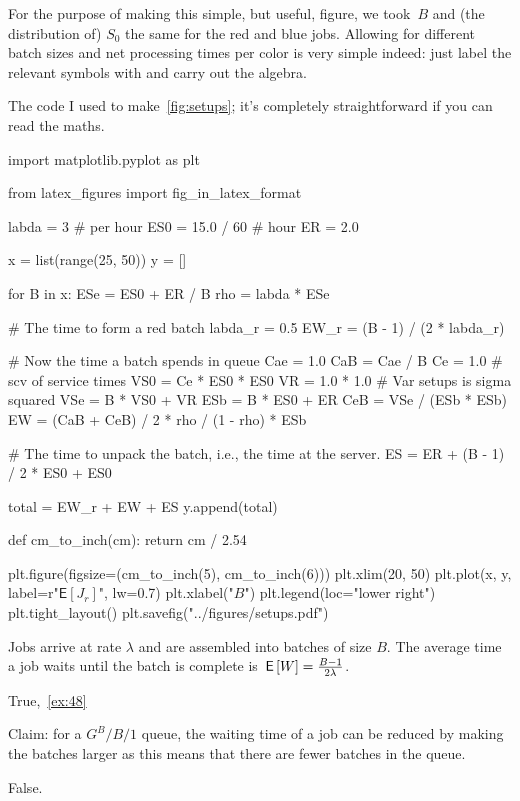 \documentclass[stochastic-or.tex]{subfiles}
\begin{document}
For the purpose of making this simple, but useful, figure, we took~$B$ and (the distribution of) $S_{0}$ the same for the red and blue jobs.
Allowing for different batch sizes and net processing times per color is very simple indeed: just label the relevant symbols with and carry out the algebra.

The code I used to make~\cref{fig:setups}; it's completely straightforward if you can read the maths.
\begin{python}
import matplotlib.pyplot as plt

from latex_figures import fig_in_latex_format


labda = 3  # per hour
ES0 = 15.0 / 60  # hour
ER = 2.0

x = list(range(25, 50))
y = []

for B in x:
    ESe = ES0 + ER / B
    rho = labda * ESe

    # The time to form a red batch
    labda_r = 0.5
    EW_r = (B - 1) / (2 * labda_r)

    # Now the time a batch spends in queue
    Cae = 1.0
    CaB = Cae / B
    Ce = 1.0  # scv of service times
    VS0 = Ce * ES0 * ES0
    VR = 1.0 * 1.0  # Var setups is sigma squared
    VSe = B * VS0 + VR
    ESb = B * ES0 + ER
    CeB = VSe / (ESb * ESb)
    EW = (CaB + CeB) / 2 * rho / (1 - rho) * ESb

    # The time to unpack the batch, i.e., the time at the server.
    ES = ER + (B - 1) / 2 * ES0 + ES0

    total = EW_r + EW + ES
    y.append(total)


def cm_to_inch(cm):
    return cm / 2.54


plt.figure(figsize=(cm_to_inch(5), cm_to_inch(6)))
plt.xlim(20, 50)
plt.plot(x, y, label=r"$\mathsf{E}[J_r]$", lw=0.7)
plt.xlabel("$B$")
plt.legend(loc="lower right")
plt.tight_layout()
plt.savefig("../figures/setups.pdf")
\end{python}


\begin{truefalse}
 Jobs arrive at rate $\lambda$ and are assembled into batches of size $B$.
 The average time a job waits until the batch is complete is $\,\mathsf{E}\left[W\right] = \frac{B-1}{2\lambda}$.
\begin{solution}True,~\cref{ex:48}
\end{solution}
\end{truefalse}

\begin{truefalse}
    Claim: for a $G^{B}/B/1$ queue, the waiting time of a job can be reduced by making the batches larger as this means that there are fewer batches in the queue.
    \begin{solution}
        False.
    \end{solution}
\end{truefalse}
\end{document}
